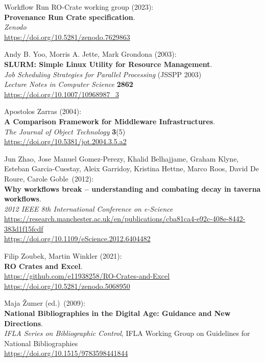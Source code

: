 \begin{thebibliography}{9}
Workflow Run RO-Crate
working group (2023):\\
\textbf{Provenance Run Crate specification}.\\
\emph{Zenodo}\\
\url{https://doi.org/10.5281/zenodo.7629863}

Andy B. Yoo, Morris A. Jette, Mark Grondona (2003):\\
\textbf{SLURM: Simple Linux Utility for Resource Management}.\\
\emph{Job Scheduling Strategies for Parallel Processing} (JSSPP 2003)\\
\emph{Lecture Notes in Computer Science} \textbf{2862}\\
\url{https://doi.org/10.1007/10968987_3}

Apostolos Zarras (2004): \\
\textbf{A {Comparison Framework} for {Middleware Infrastructures}}. \\
\emph{The Journal of Object Technology} \textbf{3}(5) \\
\url{https://doi.org/10.5381/jot.2004.3.5.a2}

Jun Zhao, Jose Manuel Gomez-Perezy, Khalid Belhajjame, Graham
Klyne, Esteban Garcia-Cuestay, Aleix Garridoy, Kristina Hettne, Marco
Roos, David De Roure, Carole Goble~(2012):\\
\textbf{Why workflows break -- understanding and combating decay in
taverna workflows}.\\
\emph{2012 IEEE 8th International Conference on e-Science}\\
\url{https://research.manchester.ac.uk/en/publications/cba81ca4-e92c-408e-8442-383d1f15fcdf}\\
\url{https://doi.org/10.1109/eScience.2012.6404482}

Filip Zoubek, Martin Winkler (2021):\\
\textbf{RO Crates and Excel}.\\
\url{https://github.com/e11938258/RO-Crates-and-Excel}\\
\url{https://doi.org/10.5281/zenodo.5068950}

Maja Žumer (ed.)~(2009):\\
\textbf{National Bibliographies in the Digital Age: Guidance and New
Directions}.\\
\emph{IFLA Series on Bibliographic Control}, IFLA Working Group on
Guidelines for National Bibliographies\\
\url{https://doi.org/10.1515/9783598441844}

\end{thebibliography}

\makeatother

